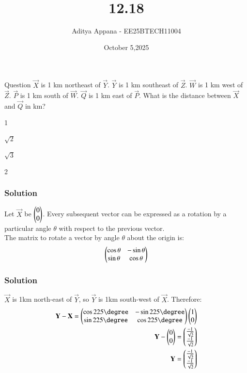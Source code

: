 \documentclass{beamer}
\title %
{12.18}
\date{October 5,2025}
\author %
{Aditya Appana - EE25BTECH11004}
\begin{document}
\frame{\titlepage}
\begin{frame}{Question}
$\vec{X}$ is 1 km northeast of $\vec{Y}$. $\vec{Y}$ is 1 km southeast of $\vec{Z}$. $\vec{W}$ is 1 km west of $\vec{Z}$. $\vec{P}$ is 1
km south of $\vec{W}$. $\vec{Q}$ is 1 km east of $\vec{P}$. What is the distance between $\vec{X}$ and $\vec{Q}$ in km?
\begin{enumerate}
\begin{multicols}{4}
    \item 1
    \item $\sqrt{2}$
    \item $\sqrt{3}$
    \item 2
\end{multicols}
\end{enumerate}
\end{frame}



\begin{frame}[fragile]
    \frametitle{Solution}
Let $\vec{X}$ be $\begin{pmatrix}0\\0\end{pmatrix}$. Every subsequent vector can be expressed as a rotation by a particular angle $\theta$ with respect to the previous vector.\\
The matrix to rotate a vector by angle $\theta$ about the origin is:
\begin{align}
\begin{pmatrix}\cos\theta & -\sin\theta \\ \sin\theta & \cos\theta\end{pmatrix}
\end{align}
\end{frame}


\begin{frame}[fragile]
    \frametitle{Solution}
$\vec{X}$ is 1km north-east of $\vec{Y}$, so $\vec{Y}$ is 1km south-west of $\vec{X}$. Therefore:\begin{align}
\vec{Y}-\vec{X} = \myvec{\cos225\degree & -\sin225\degree \\ \sin225\degree & \cos225\degree}\myvec{1\\0}\\
\vec{Y}-\myvec{0\\0} = \myvec{\frac{-1}{\sqrt{2}}\\\frac{-1}{\sqrt{2}}}\\
\vec{Y}=\myvec{\frac{-1}{\sqrt{2}}\\\frac{-1}{\sqrt{2}}}
\end{align}\\
\end{frame}
\end{document}
